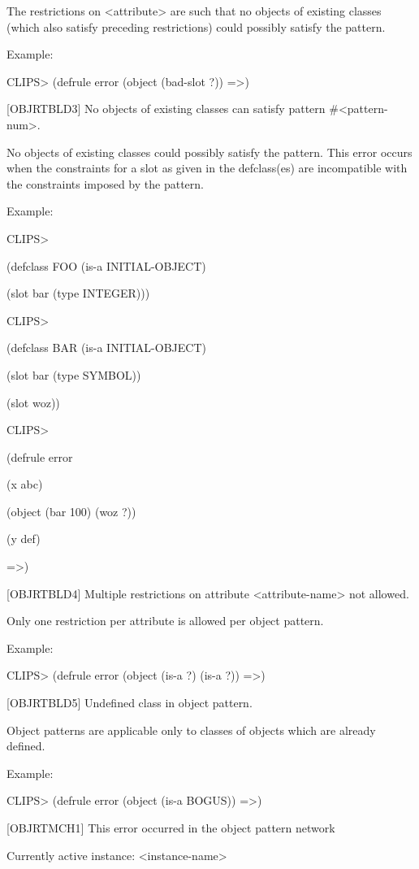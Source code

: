 \documentclass[letterpaper,10pt,english]{sphinxmanual}
\begin{document}
The restrictions on \textless{}attribute\textgreater{} are such that no objects of existing
classes (which also satisfy preceding restrictions) could possibly
satisfy the pattern.

Example:

CLIPS\textgreater{} (defrule error (object (bad-slot ?)) =\textgreater{})

{[}OBJRTBLD3{]} No objects of existing classes can satisfy pattern
\#\textless{}pattern-num\textgreater{}.

No objects of existing classes could possibly satisfy the pattern. This
error occurs when the constraints for a slot as given in the
defclass(es) are incompatible with the constraints imposed by the
pattern.

Example:

CLIPS\textgreater{}

(defclass FOO (is-a INITIAL-OBJECT)

(slot bar (type INTEGER)))

CLIPS\textgreater{}

(defclass BAR (is-a INITIAL-OBJECT)

(slot bar (type SYMBOL))

(slot woz))

CLIPS\textgreater{}

(defrule error

(x abc)

(object (bar 100) (woz ?))

(y def)

=\textgreater{})

{[}OBJRTBLD4{]} Multiple restrictions on attribute \textless{}attribute-name\textgreater{} not
allowed.

Only one restriction per attribute is allowed per object pattern.

Example:

CLIPS\textgreater{} (defrule error (object (is-a ?) (is-a ?)) =\textgreater{})

{[}OBJRTBLD5{]} Undefined class in object pattern.

Object patterns are applicable only to classes of objects which are
already defined.

Example:

CLIPS\textgreater{} (defrule error (object (is-a BOGUS)) =\textgreater{})

{[}OBJRTMCH1{]} This error occurred in the object pattern network

Currently active instance: \textless{}instance-name\textgreater{}
\end{document}
